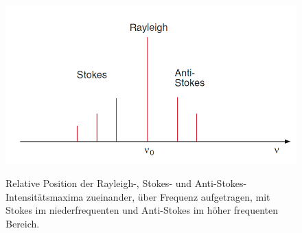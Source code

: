 \documentclass[.../bericht]{subfilies}
\begin{document}
      \begin{figure}[tb]
          \begin{center}
          \fbox
          {
            \includegraphics[scale=0.5]{figures/ramanspektrum}
          }
          \caption{Relative Position der Rayleigh-, Stokes- und Anti-Stokes-Intensitätsmaxima zueinander, über Frequenz aufgetragen, mit Stokes im niederfrequenten und Anti-Stokes im höher frequenten Bereich. \cite{dem:exp3}
          }
          \label{fig:schema}
        \end{center}
      \end{figure}
\end{document}
